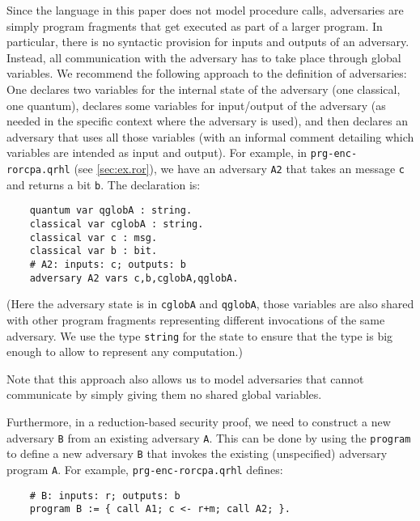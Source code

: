 \documentclass{article}
\begin{document}
Since the language in this paper does not model procedure calls,
adversaries are simply program fragments that get executed as part of
a larger program. In particular, there is no syntactic provision for
inputs and outputs of an adversary. Instead, all communication with
the adversary has to take place through global variables. We recommend
the following approach to the definition of adversaries: One declares
two variables for the internal state of the adversary (one classical,
one quantum), declares some variables for input/output of the
adversary (as needed in the specific context where the adversary is
used), and then declares an adversary that uses all those variables
(with an informal comment detailing which variables are intended as input and
output). For example, in \texttt{prg-enc-rorcpa.qrhl} (see \autoref{sec:ex.ror}), we have an
adversary \texttt{A2} that takes an message \texttt{c} and returns
a bit \texttt{b}. The declaration is:
\begin{center}
  \begin{lstlisting}
    quantum var qglobA : string.
    classical var cglobA : string.
    classical var c : msg.
    classical var b : bit.
    # A2: inputs: c; outputs: b
    adversary A2 vars c,b,cglobA,qglobA.
  \end{lstlisting}
\end{center}
(Here the adversary state is in \texttt{cglobA} and \texttt{qglobA},
those variables are also shared with other program fragments
representing different invocations of the same adversary. We use the
type \texttt{string} for the state to ensure that the type is big enough to allow to represent any computation.)

Note that this approach also allows us to model adversaries that
cannot communicate by simply giving them no shared global variables.

Furthermore, in a reduction-based security proof, we need to construct
a new adversary \texttt{B} from an existing adversary \texttt{A}. This
can be done by using the \texttt{program} to define a new adversary
\texttt{B} that invokes the existing (unspecified) adversary program
\texttt{A}. For example, 
\texttt{prg-enc-rorcpa.qrhl} defines:
\begin{center}
  \begin{lstlisting}
    # B: inputs: r; outputs: b
    program B := { call A1; c <- r+m; call A2; }.
  \end{lstlisting}
\end{center}
\end{document}
